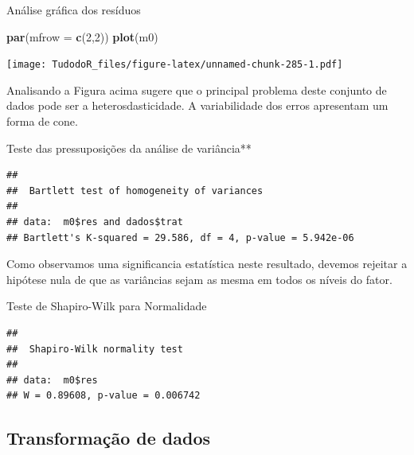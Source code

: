 \documentclass[
]{book}
\newenvironment{Shaded}{\begin{snugshade}}{\end{snugshade}}
\newcommand{\CommentTok}[1]{\textcolor[rgb]{0.56,0.35,0.01}{\textit{#1}}}
\newcommand{\DataTypeTok}[1]{\textcolor[rgb]{0.13,0.29,0.53}{#1}}
\newcommand{\DecValTok}[1]{\textcolor[rgb]{0.00,0.00,0.81}{#1}}
\newcommand{\KeywordTok}[1]{\textcolor[rgb]{0.13,0.29,0.53}{\textbf{#1}}}
\newcommand{\NormalTok}[1]{#1}
\newcommand{\OperatorTok}[1]{\textcolor[rgb]{0.81,0.36,0.00}{\textbf{#1}}}
\begin{document}
Análise gráfica dos resíduos

\begin{Shaded}
\begin{Highlighting}[]
\KeywordTok{par}\NormalTok{(}\DataTypeTok{mfrow =} \KeywordTok{c}\NormalTok{(}\DecValTok{2}\NormalTok{,}\DecValTok{2}\NormalTok{))}
\KeywordTok{plot}\NormalTok{(m0)}
\end{Highlighting}
\end{Shaded}

\texttt{[image: TudodoR\_files/figure-latex/unnamed-chunk-285-1.pdf]}

Analisando a Figura acima sugere que o principal problema deste conjunto de dados pode ser a heterosdasticidade. A variabilidade dos erros apresentam um forma de cone.

Teste das pressuposições da análise de variância**

\begin{Shaded}
\end{Shaded}

\begin{verbatim}
## 
##  Bartlett test of homogeneity of variances
## 
## data:  m0$res and dados$trat
## Bartlett's K-squared = 29.586, df = 4, p-value = 5.942e-06
\end{verbatim}

Como observamos uma significancia estatística neste resultado, devemos rejeitar a hipótese nula de que as variâncias sejam as mesma em todos os níveis do fator.

Teste de Shapiro-Wilk para Normalidade

\begin{Shaded}
\end{Shaded}

\begin{verbatim}
## 
##  Shapiro-Wilk normality test
## 
## data:  m0$res
## W = 0.89608, p-value = 0.006742
\end{verbatim}

\hypertarget{transformauxe7uxe3o-de-dados}{%
\subsection{Transformação de dados}\label{transformauxe7uxe3o-de-dados}}
\end{document}
